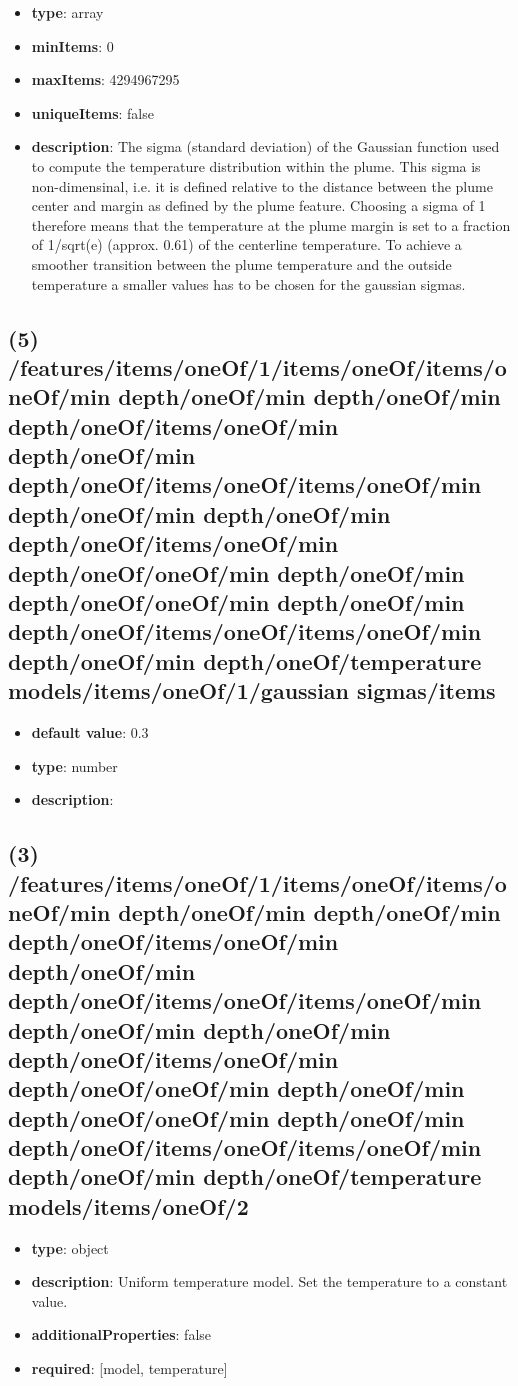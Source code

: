 \begin{itemize}[leftmargin=4em]\item {\bf type}: array
\item {\bf minItems}: 0
\item {\bf maxItems}: 4294967295
\item {\bf uniqueItems}: false
\item {\bf description}: The sigma (standard deviation) of the Gaussian function used to compute the temperature distribution within the plume. This sigma is non-dimensinal, i.e. it is defined relative to the distance between the plume center and margin as defined by the plume feature. Choosing a sigma of 1 therefore means that the temperature at the plume margin is set to a fraction of 1/sqrt(e) (approx. 0.61) of the centerline temperature. To achieve a smoother transition between the plume temperature and the outside temperature a smaller values has to be chosen for the gaussian sigmas.
\end{itemize}\subsection{(5) /features/items/oneOf/1/items/oneOf/items/oneOf/min depth/oneOf/min depth/oneOf/min depth/oneOf/items/oneOf/min depth/oneOf/min depth/oneOf/items/oneOf/items/oneOf/min depth/oneOf/min depth/oneOf/min depth/oneOf/items/oneOf/min depth/oneOf/oneOf/min depth/oneOf/min depth/oneOf/oneOf/min depth/oneOf/min depth/oneOf/items/oneOf/items/oneOf/min depth/oneOf/min depth/oneOf/temperature models/items/oneOf/1/gaussian sigmas/items}
\begin{itemize}[leftmargin=5em]\item {\bf default value}: 0.3
\item {\bf type}: number
\item {\bf description}: 
\end{itemize}\subsection{(3) /features/items/oneOf/1/items/oneOf/items/oneOf/min depth/oneOf/min depth/oneOf/min depth/oneOf/items/oneOf/min depth/oneOf/min depth/oneOf/items/oneOf/items/oneOf/min depth/oneOf/min depth/oneOf/min depth/oneOf/items/oneOf/min depth/oneOf/oneOf/min depth/oneOf/min depth/oneOf/oneOf/min depth/oneOf/min depth/oneOf/items/oneOf/items/oneOf/min depth/oneOf/min depth/oneOf/temperature models/items/oneOf/2}
\begin{itemize}[leftmargin=3em]\item {\bf type}: object
\item {\bf description}: Uniform temperature model. Set the temperature to a constant value.
\item {\bf additionalProperties}: false
\item {\bf required}: [model, temperature]\end{itemize}

